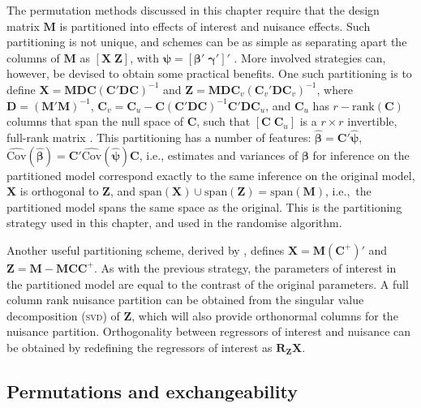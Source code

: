 The permutation methods discussed in this chapter require that the design matrix $\mathbf{M}$ is partitioned into effects of interest and nuisance effects. Such partitioning is not unique, and schemes can be as simple as separating apart the columns of $\mathbf{M}$ as $\left[ \mathbf{X} \; \mathbf{Z} \right]$, with $\boldsymbol{\psi} = \left[ \boldsymbol{\beta}' \; \boldsymbol{\gamma}' \right]'$ \citep{Guttman1982}. More involved strategies can, however, be devised to obtain some practical benefits. One such partitioning is to define $\mathbf{X} = \mathbf{M} \mathbf{D} \mathbf{C} \left(\mathbf{C}'\mathbf{D}\mathbf{C}\right)^{-1}$ and 
$\mathbf{Z} = \mathbf{M} \mathbf{D} \mathbf{C}_v \left(\mathbf{C}_v'\mathbf{D}\mathbf{C}_v\right)^{-1}$, where $\mathbf{D}=(\mathbf{M}'\mathbf{M})^{-1}$, $\mathbf{C}_v=\mathbf{C}_u-\mathbf{C}(\mathbf{C}'\mathbf{D}\mathbf{C})^{-1}\mathbf{C}'\mathbf{D}\mathbf{C}_u$, and $\mathbf{C}_u$ has $r-\mathrm{rank}\left(\mathbf{C}\right)$ columns that span the null space of $\mathbf{C}$, such that $[\mathbf{C} \; \mathbf{C}_u]$ is a $r \times r$ invertible, full-rank matrix \citep{Beckmann2001, Smith2007}. This partitioning has a number of features: $\boldsymbol{\hat{\beta}} = \mathbf{C}'\boldsymbol{\hat{\psi}}$, $\widehat{\mathrm{Cov}}(\boldsymbol{\hat{\beta}}) = \mathbf{C}'\widehat{\mathrm{Cov}}(\boldsymbol{\hat{\psi}})\mathbf{C}$, i.e., estimates and variances of $\boldsymbol{\beta}$ for inference on the partitioned model correspond exactly to the same inference on the original model, $\mathbf{X}$ is orthogonal to $\mathbf{Z}$, and $\mathrm{span}(\mathbf{X}) \cup \mathrm{span}(\mathbf{Z}) = \mathrm{span}(\mathbf{M})$, i.e.,\ the partitioned model spans the same space as the original. This is the partitioning strategy used in this chapter, and used in the randomise algorithm.

Another useful partitioning scheme, derived by \citet{Ridgway2009}, defines $\mathbf{X}=\mathbf{M}(\mathbf{C}^+)'$ and $\mathbf{Z}=\mathbf{M}-\mathbf{M}\mathbf{C}\mathbf{C}^{+}$. As with the previous strategy, the parameters of interest in the partitioned model are equal to the contrast of the original parameters. A full column rank nuisance partition can be obtained from the singular value decomposition (\textsc{svd}) of $\mathbf{Z}$, which will also provide orthonormal columns for the nuisance partition. Orthogonality between regressors of interest and nuisance can be obtained by redefining the regressors of interest as  $\mathbf{R}_{\mathbf{Z}}\mathbf{X}$.

\subsection{Permutations and exchangeability}

